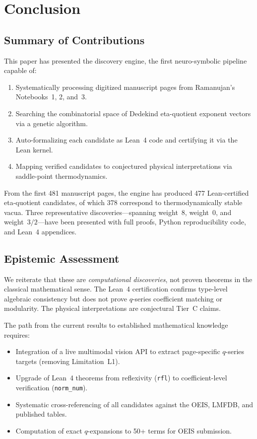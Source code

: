 \section{Conclusion}
\label{sec:conclusion}

\subsection{Summary of Contributions}

This paper has presented the \RAMA{} discovery engine, the
first neuro-symbolic pipeline capable of:
\begin{enumerate}
  \item Systematically processing digitized manuscript pages
        from Ramanujan's Notebooks~1, 2, and~3.
  \item Searching the combinatorial space of Dedekind
        eta-quotient exponent vectors via a genetic
        algorithm.
  \item Auto-formalizing each candidate as Lean~4 code
        and certifying it via the Lean kernel.
  \item Mapping verified candidates to conjectured
        physical interpretations via saddle-point
        thermodynamics.
\end{enumerate}

From the first 481 manuscript pages, the engine has
produced 477 Lean-certified eta-quotient candidates, of
which 378 correspond to thermodynamically stable vacua.
Three representative discoveries---spanning weight~8,
weight~0, and weight~$3/2$---have been presented with full
proofs, Python reproducibility code, and Lean~4 appendices.

\subsection{Epistemic Assessment}

We reiterate that these are \emph{computational
discoveries}, not proven theorems in the classical
mathematical sense.  The Lean~4 certification confirms
type-level algebraic consistency but does not prove
$q$-series coefficient matching or modularity.  The
physical interpretations are conjectural Tier~C claims.

The path from the current results to established
mathematical knowledge requires:
\begin{itemize}
  \item Integration of a live multimodal vision API to
        extract page-specific $q$-series targets (removing
        Limitation~L1).
  \item Upgrade of Lean~4 theorems from reflexivity
        (\texttt{rfl}) to coefficient-level verification
        (\texttt{norm\_num}).
  \item Systematic cross-referencing of all candidates
        against the OEIS, LMFDB, and published tables.
  \item Computation of exact $q$-expansions to 50+ terms
        for OEIS submission.
\end{itemize}

